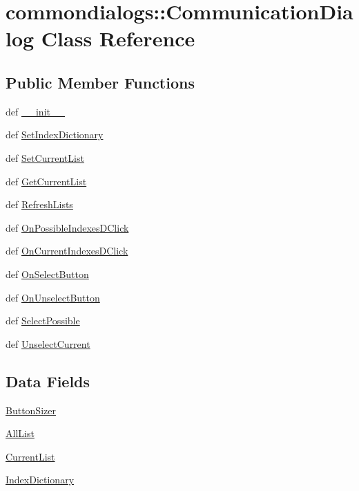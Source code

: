 \hypertarget{classcommondialogs_1_1CommunicationDialog}{
\section{commondialogs::Communication\-Dialog Class Reference}
\label{classcommondialogs_1_1CommunicationDialog}
}
\subsection*{Public Member Functions}
\begin{CompactItemize}
\item 
def \hyperlink{classcommondialogs_1_1CommunicationDialog_ee020ad81cb3ea6df76d34785bf56a36}{\_\-\_\-init\_\-\_\-}
\item 
def \hyperlink{classcommondialogs_1_1CommunicationDialog_fd58f80e7851c8b2254930aa0ea13a2c}{Set\-Index\-Dictionary}
\item 
def \hyperlink{classcommondialogs_1_1CommunicationDialog_42954cf3c548eaeccf2a6ae5793b12ca}{Set\-Current\-List}
\item 
def \hyperlink{classcommondialogs_1_1CommunicationDialog_ff2dfb0c00ca27c85c297ae134ea4f31}{Get\-Current\-List}
\item 
def \hyperlink{classcommondialogs_1_1CommunicationDialog_4d1850143516dddd4a997068f8d39707}{Refresh\-Lists}
\item 
def \hyperlink{classcommondialogs_1_1CommunicationDialog_e82c18258dbad9910746289959b51907}{On\-Possible\-Indexes\-DClick}
\item 
def \hyperlink{classcommondialogs_1_1CommunicationDialog_3ba145fc2f75f642c56795886f42662e}{On\-Current\-Indexes\-DClick}
\item 
def \hyperlink{classcommondialogs_1_1CommunicationDialog_46ef8786e87def46043ea11cfd74a279}{On\-Select\-Button}
\item 
def \hyperlink{classcommondialogs_1_1CommunicationDialog_c228ecfb891ba5beb759c9507118b1d5}{On\-Unselect\-Button}
\item 
def \hyperlink{classcommondialogs_1_1CommunicationDialog_59ad1a338abf8e3f25c43240aa5b2dab}{Select\-Possible}
\item 
def \hyperlink{classcommondialogs_1_1CommunicationDialog_102862c2ba42dbffe915fd3997eb2673}{Unselect\-Current}
\end{CompactItemize}
\subsection*{Data Fields}
\begin{CompactItemize}
\item 
\hyperlink{classcommondialogs_1_1CommunicationDialog_2cb1c15c1124804750a9991549eb6e0a}{Button\-Sizer}
\item 
\hyperlink{classcommondialogs_1_1CommunicationDialog_1d9e0865ffd28608fa78484b078a6661}{All\-List}
\item 
\hyperlink{classcommondialogs_1_1CommunicationDialog_807e6be61a54046153f1ff25e7c14928}{Current\-List}
\item 
\hyperlink{classcommondialogs_1_1CommunicationDialog_015f97d989d36b414e9370e41820a793}{Index\-Dictionary}
\end{CompactItemize}
